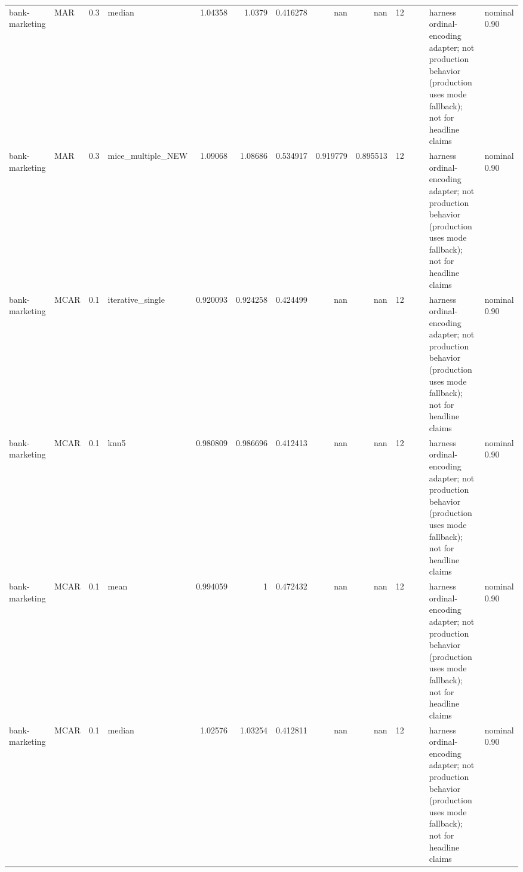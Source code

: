 \begin{table}[ht]
\begin{tabular}{llrlrrrrrrllll}
 bank-marketing       & MAR         &         0.3 & median            &       1.04358  &             1.0379   &                 0.416278 &                     nan        &                       nan        &        12 &                    &                                         & harness ordinal-encoding adapter; not production behavior (production uses mode fallback); not for headline claims & nominal 0.90              \\
 bank-marketing       & MAR         &         0.3 & mice\_multiple\_NEW &       1.09068  &             1.08686  &                 0.534917 &                       0.919779 &                         0.895513 &        12 &                    &                                         & harness ordinal-encoding adapter; not production behavior (production uses mode fallback); not for headline claims & nominal 0.90              \\
 bank-marketing       & MCAR        &         0.1 & iterative\_single  &       0.920093 &             0.924258 &                 0.424499 &                     nan        &                       nan        &        12 &                    &                                         & harness ordinal-encoding adapter; not production behavior (production uses mode fallback); not for headline claims & nominal 0.90              \\
 bank-marketing       & MCAR        &         0.1 & knn5              &       0.980809 &             0.986696 &                 0.412413 &                     nan        &                       nan        &        12 &                    &                                         & harness ordinal-encoding adapter; not production behavior (production uses mode fallback); not for headline claims & nominal 0.90              \\
 bank-marketing       & MCAR        &         0.1 & mean              &       0.994059 &             1        &                 0.472432 &                     nan        &                       nan        &        12 &                    &                                         & harness ordinal-encoding adapter; not production behavior (production uses mode fallback); not for headline claims & nominal 0.90              \\
 bank-marketing       & MCAR        &         0.1 & median            &       1.02576  &             1.03254  &                 0.412811 &                     nan        &                       nan        &        12 &                    &                                         & harness ordinal-encoding adapter; not production behavior (production uses mode fallback); not for headline claims & nominal 0.90              \\

\end{tabular}
\end{table}
